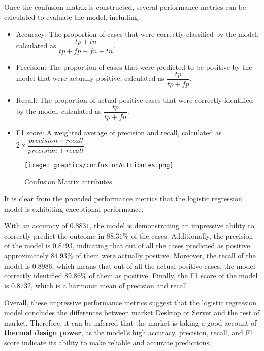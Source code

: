 Once the confusion matrix is constructed, several performance metrics can be calculated to evaluate the model, including:
\begin{itemize}
    \item Accuracy: The proportion of cases that were correctly classified by the model, calculated as $\dfrac{tp+tn}{tp+fp+fn+tn}$.
    \item Precision: The proportion of cases that were predicted to be positive by the model that were actually positive, calculated as $\dfrac{tp}{tp+fp}$.
    \item Recall: The proportion of actual positive cases that were correctly identified by the model, calculated as $\dfrac{tp}{tp+fn}$.
    \item F1 score: A weighted average of precision and recall, calculated as $2\times\dfrac{precision\times recall}{precision+recall}$.
\end{itemize}
\begin{figure}[H]
    \centering
    \texttt{[image: graphics/confusionAttributes.png]}
    \caption{Confusion Matrix attributes}
    \label{fig:conf_att}
\end{figure}

It is clear from the provided performance metrics that the logistic regression model is exhibiting exceptional performance.

With an accuracy of $0.8831$, the model is demonstrating an impressive ability to correctly predict the outcome in $88.31\%$ of the cases. Additionally, the precision of the model is $0.8493$, indicating that out of all the cases predicted as positive, approximately $84.93\%$ of them were actually positive. Moreover, the recall of the model is $0.8986$, which means that out of all the actual positive cases, the model correctly identified $89.86\%$ of them as positive. Finally, the F1 score of the model is $0.8732$, which is a harmonic mean of precision and recall.

Overall, these impressive performance metrics suggest that the logistic regression model concludes the differences between market Desktop or Server and the rest of market. Therefore, it can be inferred that the market is taking a good account of \textbf{thermal design power}, as the model's high accuracy, precision, recall, and F1 score indicate its ability to make reliable and accurate predictions.

